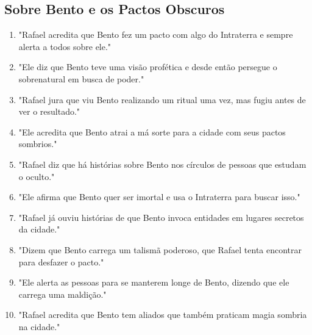 \subsection*{Sobre Bento e os Pactos Obscuros}
\begin{enumerate}
    \item "Rafael acredita que Bento fez um pacto com algo do Intraterra e sempre alerta a todos sobre ele."
    \item "Ele diz que Bento teve uma visão profética e desde então persegue o sobrenatural em busca de poder."
    \item "Rafael jura que viu Bento realizando um ritual uma vez, mas fugiu antes de ver o resultado."
    \item "Ele acredita que Bento atrai a má sorte para a cidade com seus pactos sombrios."
    \item "Rafael diz que há histórias sobre Bento nos círculos de pessoas que estudam o oculto."
    \item "Ele afirma que Bento quer ser imortal e usa o Intraterra para buscar isso."
    \item "Rafael já ouviu histórias de que Bento invoca entidades em lugares secretos da cidade."
    \item "Dizem que Bento carrega um talismã poderoso, que Rafael tenta encontrar para desfazer o pacto."
    \item "Ele alerta as pessoas para se manterem longe de Bento, dizendo que ele carrega uma maldição."
    \item "Rafael acredita que Bento tem aliados que também praticam magia sombria na cidade."
\end{enumerate}

